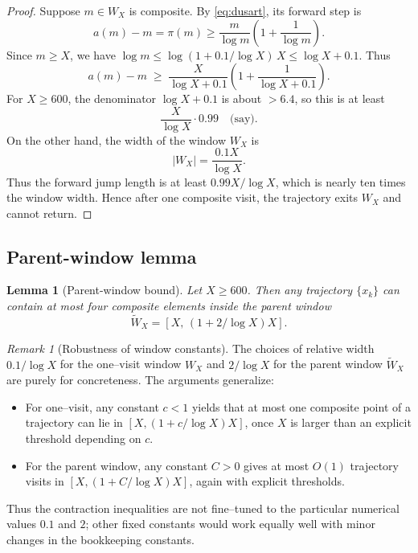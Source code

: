 \documentclass[11pt]{article}
\theoremstyle{plain}
\newtheorem{lemma}[theorem]{Lemma}
\theoremstyle{definition}
\theoremstyle{remark}
\newtheorem*{remark}{Remark}
\begin{document}
\begin{proof}
Suppose $m\in W_X$ is composite. By \eqref{eq:dusart}, its forward step is
\[
a(m) - m = \pi(m) \geq \frac{m}{\log m}\left(1 + \frac{1}{\log m}\right).
\]
Since $m\geq X$, we have $\log m \leq \log(1+0.1/\log X)\,X \leq \log X + 0.1$. Thus
\[
a(m)-m \;\geq\; \frac{X}{\log X+0.1}\left(1+\frac{1}{\log X+0.1}\right).
\]
For $X\geq 600$, the denominator $\log X+0.1$ is about $>6.4$, so this is at least
\[
\frac{X}{\log X}\cdot 0.99 \quad \text{(say)}.
\]
On the other hand, the width of the window $W_X$ is
\[
|W_X| = \frac{0.1X}{\log X}.
\]
Thus the forward jump length is at least $0.99X/\log X$, which is nearly ten times the window width. Hence after one composite visit, the trajectory exits $W_X$ and cannot return. 
\end{proof}

\subsection{Parent-window lemma}

\begin{lemma}[Parent-window bound]\label{lem:parent}
Let $X \geq 600$. Then any trajectory $\{x_k\}$ can contain at most four composite elements inside the parent window
\[
\widetilde W_X = \left[X,\,(1+2/\log X)X\right].
\]
\end{lemma}

\begin{remark}[Robustness of window constants]
The choices of relative width $0.1/\log X$ for the one--visit window $W_X$
and $2/\log X$ for the parent window $\widetilde W_X$ are purely for
concreteness. The arguments generalize:
\begin{itemize}
\item For one--visit, any constant $c<1$ yields that at most one composite
point of a trajectory can lie in $[X,(1+c/\log X)X]$, once $X$ is larger
than an explicit threshold depending on $c$.
\item For the parent window, any constant $C>0$ gives at most $O(1)$
trajectory visits in $[X,(1+C/\log X)X]$, again with explicit thresholds.
\end{itemize}
Thus the contraction inequalities are not fine--tuned to the particular
numerical values $0.1$ and $2$; other fixed constants would work equally
well with minor changes in the bookkeeping constants.
\end{remark}
\end{document}
